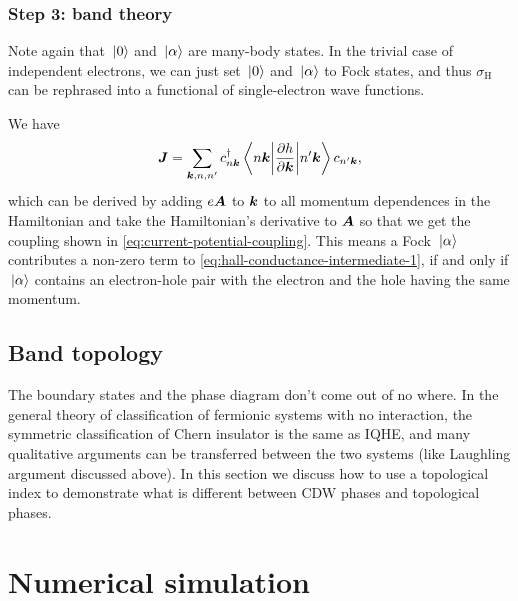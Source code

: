 \documentclass[hyperref, a4paper]{article}
\begin{document}
\subsubsection{Step 3: band theory} 

Note again that $\ket*{0}$ and $\ket*{\alpha}$ are many-body states.
In the trivial case of independent electrons, 
we can just set $\ket*{0}$ and $\ket*{\alpha}$ to Fock states, 
and thus $\sigma_{\text{H}}$ can be rephrased into 
a functional of single-electron wave functions.

We have 
\begin{equation}
    \vb*{J} = \sum_{\vb*{k}, n, n'} 
    c^\dagger_{n \vb*{k}} \mel**{n \vb*{k}}{\pdv{h}{\vb*{k}}}{n' \vb*{k}} c_{n' \vb*{k}},
\end{equation}
which can be derived by adding $e\vb*{A}$ to $\vb*{k}$ to all momentum dependences 
in the Hamiltonian 
and take the Hamiltonian's derivative to $\vb*{A}$ 
so that we get the coupling shown in \eqref{eq:current-potential-coupling}.
This means a Fock $\ket*{\alpha}$ contributes a non-zero term to 
\eqref{eq:hall-conductance-intermediate-1},
if and only if $\ket*{\alpha}$ contains an 
electron-hole pair with the electron and the hole having the same momentum.


\subsection{Band topology}

The boundary states and the phase diagram don't come out of no where.
In the general theory of classification of fermionic systems with no interaction, 
the symmetric classification of Chern insulator is the same as IQHE,
and many qualitative arguments can be transferred 
between the two systems
(like Laughling argument discussed above).
In this section we discuss how to use a topological index 
to demonstrate what is different 
between CDW phases and topological phases. 

\section{Numerical simulation}





\end{document}
